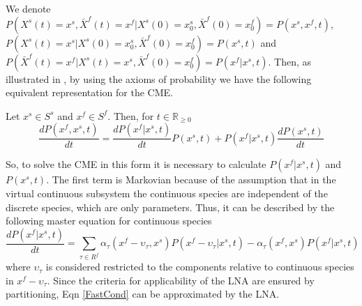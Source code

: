 \documentclass{llncs}
\begin{document}
 We denote $P(X^s(t)=x^s,\bar{X}^f(t)=x^f|X^s(0)=x^s_0,\bar{X}^f(0)=x^f_0)=P(x^s,x^f,t)$, $P(X^s(t)=x^s|X^s(0)=x^s_0,\bar{X}^f(0)=x^f_0)=P(x^s,t)$ and  $P(\bar{X}^f(t)=x^f|X^s(t)=x^s,\bar{X}^f(0)=x^f_0)=P(x^f|x^s,t)$. Then, as illustrated in \cite{rao2003stochastic},  by using the axioms of probability we have the following equivalent representation for the CME.
\begin{lemma}\label{Principal}
Let $x^s \in S^s$ and $x^f \in S^f$. Then, for $t \in \mathbb{R}_{\geq 0}$
\begin{equation*}
 \frac{d P(x^f,x^s,t)}{dt}=\frac{d P(x^f|x^s,t)}{dt} P(x^s,t)+ P(x^f|x^s,t)\frac{ d P(x^s,t)}{dt}
 \end{equation*}
 \end{lemma}
 So, to solve the CME in this form it is necessary to calculate $P(x^f|x^s,t)$ and $P(x^s,t)$. The first term is Markovian because of the assumption that in the virtual continuous subsystem the continuous species are independent of the discrete species, which are only parameters.
 Thus, it can be described by the following master equation for continuous species
 \begin{equation}\label{FastCond}
 \frac{d P(x^f|x^s,t)}{dt}=\sum_{\tau \in R^f}\alpha_{\tau}(x^f-\upsilon_{\tau},x^s)P(x^f-\upsilon_{\tau}|x^s,t)- \alpha_{\tau}(x^f,x^s)P(x^f|x^s,t)
 \end{equation}
 where $\upsilon_{\tau}$ is considered restricted to the components relative to continuous species in $x^f-\upsilon_{\tau}$.
Since the criteria for applicability of the LNA are ensured by partitioning, Eqn \eqref{FastCond} can be approximated by the LNA.
\end{document}
